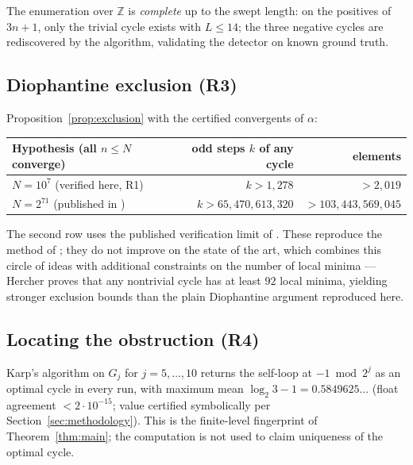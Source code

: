 \documentclass[11pt]{amsart}
\theoremstyle{definition}
\theoremstyle{remark}
\newcommand{\Z}{\mathbb{Z}}
\begin{document}
The enumeration over $\Z$ is \emph{complete} up to the swept length: on the positives of $3n+1$, only the trivial cycle exists with $L \le 14$; the three negative cycles are rediscovered by the algorithm, validating the detector on known ground truth.

\subsection{Diophantine exclusion (R3)}\label{sec:results-exclusion}
Proposition~\ref{prop:exclusion} with the certified convergents of $\alpha$:
\begin{center}\small
\begin{tabular}{lrr}
\toprule
Hypothesis (all $n \le N$ converge) & odd steps $k$ of any cycle & elements \\
\midrule
$N = 10^7$ (verified here, R1) & $k > 1{,}278$ & $> 2{,}019$ \\
$N = 2^{71}$ (published in \cite{barina2025}) & $k > 65{,}470{,}613{,}320$ & $> 103{,}443{,}569{,}045$ \\
\bottomrule
\end{tabular}
\end{center}
The second row uses the published verification limit of \cite{barina2025}. These reproduce the method of \cite{eliahou1993,simonsdeweger2005}; they do not improve on the state of the art, which combines this circle of ideas with additional constraints on the number of local minima --- Hercher \cite{hercher2023} proves that any nontrivial cycle has at least $92$ local minima, yielding stronger exclusion bounds than the plain Diophantine argument reproduced here.

\subsection{Locating the obstruction (R4)}\label{sec:results-karp}
Karp's algorithm on $G_j$ for $j = 5,\dots,10$ returns the self-loop at $-1 \bmod 2^j$ as an optimal cycle in every run, with maximum mean $\log_2 3 - 1 = 0.5849625\ldots$ (float agreement $< 2\cdot10^{-15}$; value certified symbolically per Section~\ref{sec:methodology}). This is the finite-level fingerprint of Theorem~\ref{thm:main}; the computation is not used to claim uniqueness of the optimal cycle.
\end{document}
